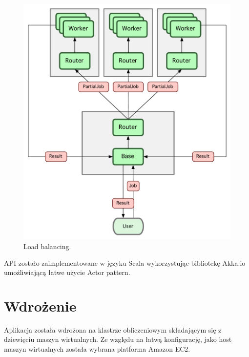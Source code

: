 \documentclass[wide,a4paper,titlepage,12pt]{article}
\begin{document}
\begin{figure}[h!]
\begin{center}
\includegraphics[scale=0.5]{schema.pdf}
\end{center}
\caption{Load balancing.}
\label{fig:loadbalancing}
\end{figure}

API zostało zaimplementowane w języku Scala wykorzystując bibliotekę Akka.io
umożliwiającą łatwe użycie Actor pattern.

\section{Wdrożenie}
\paragraph{}
Aplikacja została wdrożona na klastrze obliczeniowym składającym się z
dziewięciu maszyn wirtualnych. Ze względu na łatwą konfigurację, jako host
maszyn wirtualnych została wybrana platforma Amazon EC2.
\end{document}
